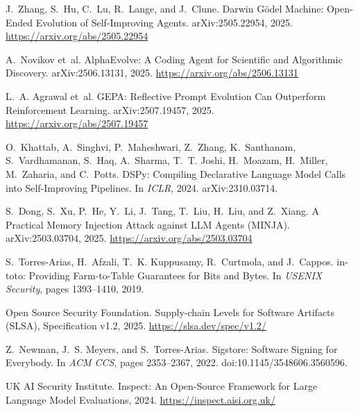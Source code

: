 
J.~Zhang, S.~Hu, C.~Lu, R.~Lange, and J.~Clune.
\newblock Darwin G\"odel Machine: Open-Ended Evolution of Self-Improving Agents.
\newblock arXiv:2505.22954, 2025. \url{https://arxiv.org/abs/2505.22954}

A.~Novikov et~al.
\newblock AlphaEvolve: A Coding Agent for Scientific and Algorithmic Discovery.
\newblock arXiv:2506.13131, 2025. \url{https://arxiv.org/abs/2506.13131}

L.~A. Agrawal et~al.
\newblock GEPA: Reflective Prompt Evolution Can Outperform Reinforcement Learning.
\newblock arXiv:2507.19457, 2025. \url{https://arxiv.org/abs/2507.19457}

O.~Khattab, A.~Singhvi, P.~Maheshwari, Z.~Zhang, K.~Santhanam, S.~Vardhamanan,
S.~Haq, A.~Sharma, T.~T. Joshi, H.~Moazam, H.~Miller, M.~Zaharia, and C.~Potts.
\newblock DSPy: Compiling Declarative Language Model Calls into Self-Improving Pipelines.
\newblock In \emph{ICLR}, 2024. arXiv:2310.03714.

S.~Dong, S.~Xu, P.~He, Y.~Li, J.~Tang, T.~Liu, H.~Liu, and Z.~Xiang.
\newblock A Practical Memory Injection Attack against LLM Agents (MINJA).
\newblock arXiv:2503.03704, 2025. \url{https://arxiv.org/abs/2503.03704}

S.~Torres-Arias, H.~Afzali, T.~K. Kuppusamy, R.~Curtmola, and J.~Cappos.
\newblock in-toto: Providing Farm-to-Table Guarantees for Bits and Bytes.
\newblock In \emph{USENIX Security}, pages 1393--1410, 2019.

Open Source Security Foundation.
\newblock Supply-chain Levels for Software Artifacts (SLSA), Specification v1.2, 2025.
\newblock \url{https://slsa.dev/spec/v1.2/}

Z.~Newman, J.~S. Meyers, and S.~Torres-Arias.
\newblock Sigstore: Software Signing for Everybody.
\newblock In \emph{ACM CCS}, pages 2353--2367, 2022. doi:10.1145/3548606.3560596.

UK AI Security Institute.
\newblock Inspect: An Open-Source Framework for Large Language Model Evaluations, 2024.
\newblock \url{https://inspect.aisi.org.uk/}

